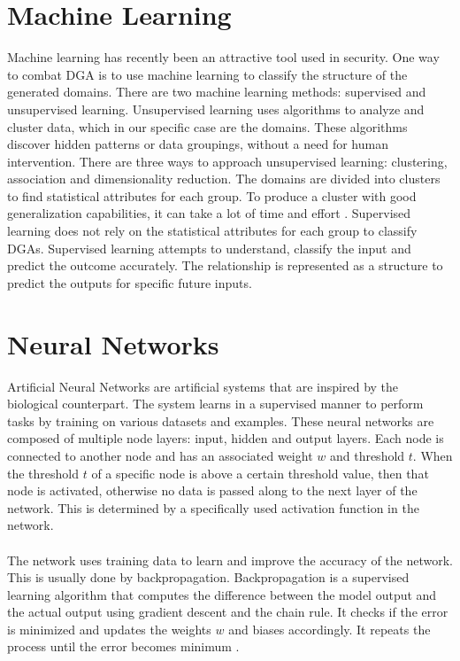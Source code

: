 \section{Machine Learning}
Machine learning has recently been an attractive tool used in security. One way to combat DGA is to use machine learning to classify the structure of the generated domains. There are two machine learning methods: supervised and unsupervised learning. Unsupervised learning uses algorithms to analyze and cluster data, which in our specific case are the domains. These algorithms discover hidden patterns or data groupings, without a need for human intervention. There are three ways to approach unsupervised learning: clustering, association and dimensionality reduction. The domains are divided into clusters to find statistical attributes for each group. To produce a cluster with good generalization capabilities, it can take a lot of time and effort \cite{Unsupervised}. Supervised learning does not rely on the statistical attributes for each group to classify DGAs. Supervised learning attempts to understand, classify the input and predict the outcome accurately. The relationship is represented as a structure to predict the outputs for specific future inputs. 

\pagebreak

\section{Neural Networks}
Artificial Neural Networks are artificial systems that are inspired by the biological counterpart. The system learns in a supervised manner to perform tasks by training on various datasets and examples. These neural networks are composed of multiple node layers: input, hidden and output layers. Each node is connected to another node and has an associated weight $w$ and threshold $t$. When the threshold $t$ of a specific node is above a certain threshold value, then that node is activated, otherwise no data is passed along to the next layer of the network. This is determined by a specifically used activation function in the network.\\\\
The network uses training data to learn and improve the accuracy of the network. This is usually done by backpropagation. Backpropagation is a supervised learning algorithm that computes the difference between the model output and the actual output using gradient descent and the chain rule. It checks if the error is minimized and updates the weights $w$ and biases accordingly. It repeats the process until the error becomes minimum \cite{Gradient_Descent}. 

